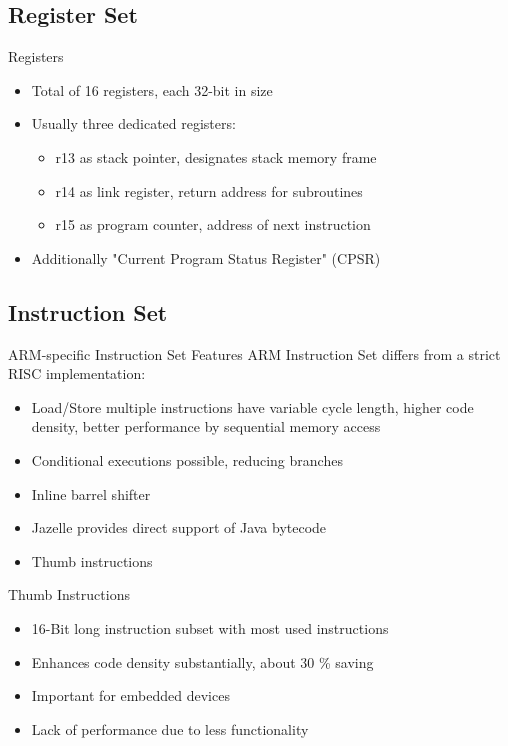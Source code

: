 \documentclass{beamer}
\begin{document}
\subsection{Register Set}
\begin{frame}[t]{Registers}
    \begin{itemize}
        \item<1-> Total of 16 registers, each 32-bit in size
        \item<2-> Usually three dedicated registers: 
        \begin{itemize}
            \item r13 as stack pointer, designates stack memory frame
            \item r14 as link register, return address for subroutines
            \item r15 as program counter, address of next instruction
        \end{itemize}
        \item<3-> Additionally "Current Program Status Register" (CPSR)\\ 
    \end{itemize}
\end{frame}

\subsection{Instruction Set}

\begin{frame}[t]{ARM-specific Instruction Set Features}
  ARM Instruction Set differs from a strict RISC implementation:
  \begin{itemize}
      \item<1-> Load/Store multiple instructions have variable cycle length, higher code density, better performance by sequential memory access
      \item<2-> Conditional executions possible, reducing branches
      \item<3-> Inline barrel shifter
  \end{itemize}
  \begin{itemize}
      \item<4-> Jazelle provides direct support of Java bytecode
      \item<4-> Thumb instructions
  \end{itemize}
\end{frame}

\begin{frame}[t]{Thumb Instructions}
    \begin{itemize}
        \item<1-> 16-Bit long instruction subset with most used instructions
        \item<2-> Enhances code density substantially, about 30 \% saving
        \item<2-> Important for embedded devices
        \item<3-> Lack of performance due to less functionality
    \end{itemize}
\end{frame}
\end{document}
